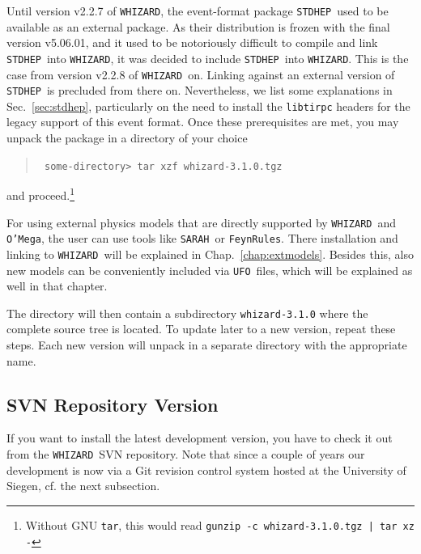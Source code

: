 \documentclass[12pt]{book}
\newcommand{\ttt}[1]{\texttt{#1}}
\newcommand{\whizard}{\ttt{WHIZARD}}
\newcommand{\oMega}{\ttt{O'Mega}}
\newcommand{\stdhep}{\ttt{STDHEP}}
\newcommand{\sarah}{\ttt{SARAH}}
\newcommand{\FeynRules}{\ttt{FeynRules}}
\newcommand{\UFO}{\ttt{UFO}}
\newcommand{\thisversion}{3.1.0}
\begin{document}
Until version v2.2.7 of \whizard, the event-format package \stdhep\ used
to be available as an external package. As their distribution is frozen
with the final version v5.06.01, and it used to be notoriously difficult to
compile and link \stdhep\ into \whizard, it was decided to include \stdhep\
into \whizard. This is the case from version v2.2.8 of \whizard\ on. Linking
against an external version of \stdhep\ is precluded from there
on. Nevertheless, we list some explanations in Sec.~\ref{sec:stdhep},
particularly on the need to install the \ttt{libtirpc} headers for the
legacy support of this event format. Once these prerequisites are met,
you may unpack the package in a directory of your choice
\begin{quote}\small\tt
  some-directory> tar xzf whizard-\thisversion.tgz
\end{quote}
and proceed.\footnote{Without GNU \ttt{tar}, this would read
  \ttt{\small gunzip -c whizard-\thisversion.tgz | tar xz -}}

For using external physics models that are directly supported by
\whizard\ and \oMega, the user can use tools like \sarah\ or
\FeynRules. There installation and linking to \whizard\ will be
explained in Chap.~\ref{chap:extmodels}. Besides this, also new models
can be conveniently included via \UFO\ files, which will be explained
as well in that chapter.

The directory will then contain a subdirectory \ttt{whizard-\thisversion}
where the complete source tree is located.  To update later to a new
version, repeat these steps.  Each new version will unpack in a
separate directory with the appropriate name.


\subsection{SVN Repository Version}

If you want to install the latest development version, you have to
check it out from the \whizard\ SVN repository. Note that since a
couple of years our development is now via a Git revision control
system hosted at the University of Siegen, cf. the next subsection.
\end{document}
